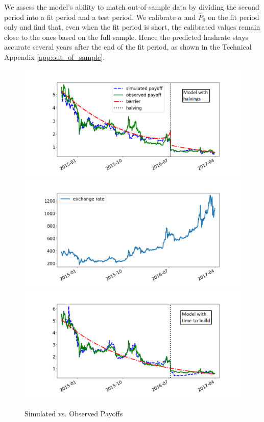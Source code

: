 \documentclass[12pt, a4paper]{article}
\begin{document}
We assess the model's ability to match
out-of-sample data by dividing the second period into a fit period and a
test period. We calibrate $a$ and $\overline{P}_0$ on the fit period only
and find that, even when the fit period is short, the calibrated
values remain close to the ones based on the full sample. Hence the predicted
hashrate stays accurate several years after the end of the fit period, as shown in
the Technical Appendix \ref{app:out_of_sample}.


\begin{figure}[]
\caption{Simulated vs. Observed Payoffs}
\label{fig:payoffs}\centering
\includegraphics[scale=0.48]{images/P_P_sim_hf_2_wide.png}
\includegraphics[scale=0.50]{images/cours2_wide.png}
\includegraphics[scale=0.48]{images/P_P_sim_delay_2_wide.png}
\end{figure}
\end{document}

